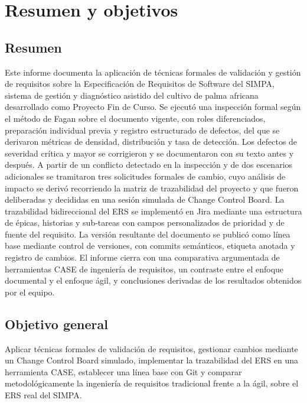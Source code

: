 \documentclass[11pt,letterpaper]{article}
\begin{document}
\tableofcontents
\newpage

\section{Resumen y objetivos}

\subsection*{Resumen}

Este informe documenta la aplicación de técnicas formales de validación y gestión de requisitos
sobre la Especificación de Requisitos de Software del SIMPA, sistema de gestión y diagnóstico
asistido del cultivo de palma africana desarrollado como Proyecto Fin de Curso. Se ejecutó una
inspección formal según el método de Fagan sobre el documento vigente, con roles diferenciados,
preparación individual previa y registro estructurado de defectos, del que se derivaron métricas de
densidad, distribución y tasa de detección. Los defectos de severidad crítica y mayor se corrigieron
y se documentaron con su texto antes y después. A partir de un conflicto detectado en la inspección
y de dos escenarios adicionales se tramitaron tres solicitudes formales de cambio, cuyo análisis de
impacto se derivó recorriendo la matriz de trazabilidad del proyecto y que fueron deliberadas y
decididas en una sesión simulada de Change Control Board. La trazabilidad bidireccional del ERS se
implementó en Jira mediante una estructura de épicas, historias y sub-tareas con campos
personalizados de prioridad y de fuente del requisito. La versión resultante del documento se
publicó como línea base mediante control de versiones, con commits semánticos, etiqueta anotada y
registro de cambios. El informe cierra con una comparativa argumentada de herramientas CASE de
ingeniería de requisitos, un contraste entre el enfoque documental y el enfoque ágil, y conclusiones
derivadas de los resultados obtenidos por el equipo.

\subsection*{Objetivo general}

Aplicar técnicas formales de validación de requisitos, gestionar cambios mediante un Change Control
Board simulado, implementar la trazabilidad del ERS en una herramienta CASE, establecer una línea
base con Git y comparar metodológicamente la ingeniería de requisitos tradicional frente a la ágil,
sobre el ERS real del SIMPA.
\end{document}
